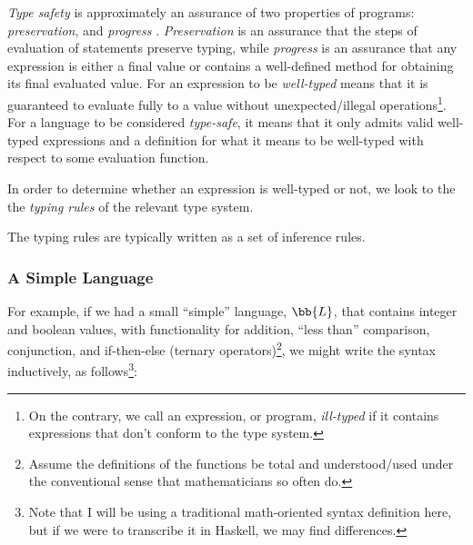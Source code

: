 \textit{Type safety} is approximately an assurance of two properties of
programs: \textit{preservation}, and \textit{progress} \cite{Harper2016}.
\textit{Preservation} is an assurance that the steps of evaluation of statements
preserve typing, while \textit{progress} is an assurance that any expression is
either a final value or contains a well-defined method for obtaining its final
evaluated value. For an expression to be \textit{well-typed} means that it is
guaranteed to evaluate fully to a value without unexpected/illegal
operations\footnote{On the contrary, we call an expression, or program,
\textit{ill-typed} if it contains expressions that don't conform to the type
system.}. For a language to be considered \textit{type-safe}, it means that it
only admits valid well-typed expressions and a definition for what it means to
be well-typed with respect to some evaluation function.

In order to determine whether an expression is well-typed or not, we look to the
the \textit{typing rules} of the relevant type system. 

The typing rules are typically written as a set of inference rules.

\subsubsection{A Simple Language}
\label{chap:typedExpr:sec:coherence:subsec:type-safety:subsubsec:a-simple-language}

For example, if we had a small ``simple'' language, \(\bb{L}\), that contains
integer and boolean values, with functionality for addition, ``less than''
comparison, conjunction, and if-then-else (ternary operators)\footnote{Assume
the definitions of the functions be total and understood/used under the
conventional sense that mathematicians so often do.}, we might write the syntax
inductively, as follows\footnote{Note that I will be using a traditional
math-oriented syntax definition here, but if we were to transcribe it in
Haskell, we may find differences.}:

